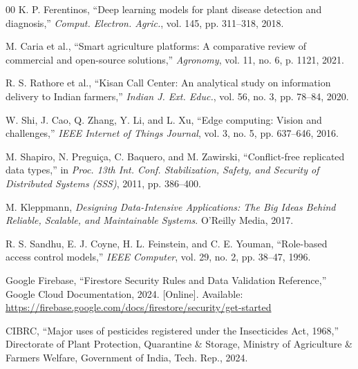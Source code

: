 \documentclass[conference]{IEEEtran}
\begin{document}
\begin{thebibliography}{00}
K. P. Ferentinos, ``Deep learning models for plant disease detection and diagnosis,'' \emph{Comput. Electron. Agric.}, vol. 145, pp. 311--318, 2018.

M. Caria et al., ``Smart agriculture platforms: A comparative review of commercial and open-source solutions,'' \emph{Agronomy}, vol. 11, no. 6, p. 1121, 2021.

R. S. Rathore et al., ``Kisan Call Center: An analytical study on information delivery to Indian farmers,'' \emph{Indian J. Ext. Educ.}, vol. 56, no. 3, pp. 78--84, 2020.

W. Shi, J. Cao, Q. Zhang, Y. Li, and L. Xu, ``Edge computing: Vision and challenges,'' \emph{IEEE Internet of Things Journal}, vol. 3, no. 5, pp. 637--646, 2016.

M. Shapiro, N. Pregui{\c{c}}a, C. Baquero, and M. Zawirski, ``Conflict-free replicated data types,'' in \emph{Proc. 13th Int. Conf. Stabilization, Safety, and Security of Distributed Systems (SSS)}, 2011, pp. 386--400.

M. Kleppmann, \emph{Designing Data-Intensive Applications: The Big Ideas Behind Reliable, Scalable, and Maintainable Systems}. O'Reilly Media, 2017.

R. S. Sandhu, E. J. Coyne, H. L. Feinstein, and C. E. Youman, ``Role-based access control models,'' \emph{IEEE Computer}, vol. 29, no. 2, pp. 38--47, 1996.

Google Firebase, ``Firestore Security Rules and Data Validation Reference,'' Google Cloud Documentation, 2024. [Online]. Available: \url{https://firebase.google.com/docs/firestore/security/get-started}

CIBRC, ``Major uses of pesticides registered under the Insecticides Act, 1968,'' Directorate of Plant Protection, Quarantine \& Storage, Ministry of Agriculture \& Farmers Welfare, Government of India, Tech. Rep., 2024.

\end{thebibliography}
\end{document}
